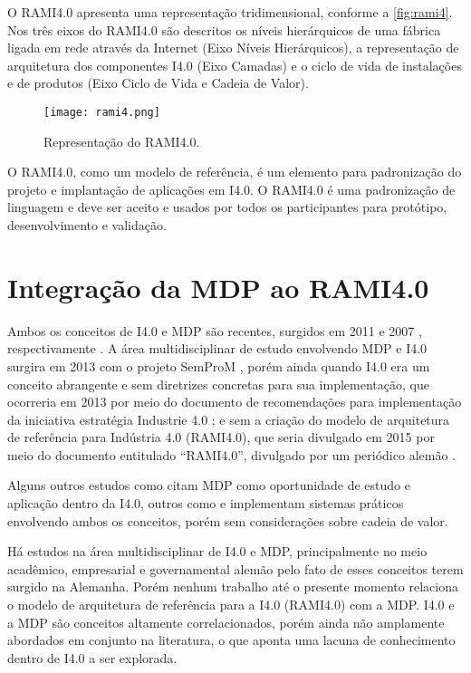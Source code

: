 	O RAMI4.0 apresenta uma representação tridimensional, conforme a \autoref{fig:rami4}. Nos três eixos do RAMI4.0 são descritos os níveis hierárquicos de uma fábrica ligada em rede através da Internet (Eixo Níveis Hierárquicos), a representação de arquitetura dos componentes I4.0 (Eixo Camadas) e o ciclo de vida de instalações e de produtos (Eixo Ciclo de Vida e Cadeia de Valor).
	
	\begin{figure}[htb]
		\centering
		\caption{Representação do RAMI4.0.}
		\label{fig:rami4}
		\texttt{[image: rami4.png]}
	\end{figure}
	
	O RAMI4.0, como um modelo de referência, é um elemento para padronização do projeto e implantação de aplicações em I4.0. O RAMI4.0 é uma padronização de linguagem e deve ser aceito e usados por todos os participantes para protótipo, desenvolvimento e validação.
	
\section{Integração da MDP ao RAMI4.0}

	Ambos os conceitos de I4.0 e MDP são recentes, surgidos em 2011 \cite{kagermann2011industrie} e 2007 \cite{wahlster2007digitalmemory}, respectivamente . A área multidisciplinar de estudo envolvendo MDP e I4.0 surgira em 2013 com o projeto SemProM \cite{wahlster2013semprom}, porém ainda quando I4.0 era um conceito abrangente e sem diretrizes concretas para sua implementação, que ocorreria em 2013 por meio do documento de recomendações para implementação da iniciativa estratégia Industrie 4.0 \cite{kagermann2013recommendations}; e sem a criação do modelo de arquitetura de referência para Indústria 4.0 (RAMI4.0), que seria divulgado em 2015 por meio do documento entitulado ``RAMI4.0'', divulgado por um periódico alemão \cite{hankel2015rami}.

	Alguns outros estudos como  citam MDP como oportunidade de estudo e aplicação dentro da I4.0, outros como  e  implementam sistemas práticos envolvendo ambos os conceitos, porém sem considerações sobre cadeia de valor.

	Há estudos na área multidisciplinar de I4.0 e MDP, principalmente no meio acadêmico, empresarial e governamental alemão pelo fato de esses conceitos terem surgido na Alemanha. Porém nenhum trabalho até o presente momento relaciona o modelo de arquitetura de referência para a I4.0 (RAMI4.0) com a MDP. I4.0 e a MDP são conceitos altamente correlacionados, porém ainda não amplamente abordados em conjunto na literatura, o que aponta uma lacuna de conhecimento dentro de I4.0 a ser explorada.

